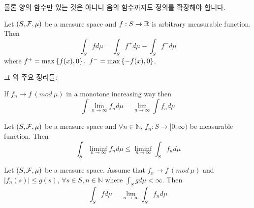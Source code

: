\documentclass[final]{IEEEphot}
\begin{document}
물론 양의 함수만 있는 것은 아니니 음의 함수까지도 정의를 확장해야 합니다.

\begin{definition}
	Let $(S, \mathcal{F}, \mu)$ be a measure space and $f: S\rightarrow \mathbb{R}$ is arbitrary measurable function. Then
	$$\int_S f d\mu = \int_S f^+ d\mu - \int_S f^- d\mu$$
	where $f^+ = \max\left\{ f(x), 0 \right\},~f^- = \max\left\{ -f(x),0 \right\}$.
	
	\HL 
\end{definition}

\newpage

그 외 주요 정리들:

\begin{theorem}
	If $f_n \rightarrow f~(mod~\mu)$ in a monotone increasing way then
	$$\int \lim_{n\rightarrow\infty}f_n d\mu = \lim_{n\rightarrow\infty}\int f_n d\mu$$
	
	\HL
\end{theorem}

\begin{theorem}
	Let $(S, \mathcal{F}, \mu)$ be a measure space and $\forall n \in \mathbb{N}$, $f_n : S \rightarrow [0,\infty)$ be measurable function. Then
	$$\int_S \liminf_{n\rightarrow\infty}f_n d\mu \leq \liminf_{n\rightarrow\infty} \int_S f_n d\mu$$
	
	\HL
\end{theorem}

\begin{theorem}
	Let $(S,\mathcal{F},\mu)$ be a measure space. Assume that $f_n \rightarrow f~(mod~\mu)$ and $|f_n(s)| \leq g(s)$, $\forall s \in S, n \in \mathbb{N}$ where $\int_S g d\mu < \infty$. Then
	$$\int_S f d\mu = \lim_{n\rightarrow\infty} \int_S f_n d\mu$$
	
	\HL
\end{theorem}

\

%
%


\end{document}
